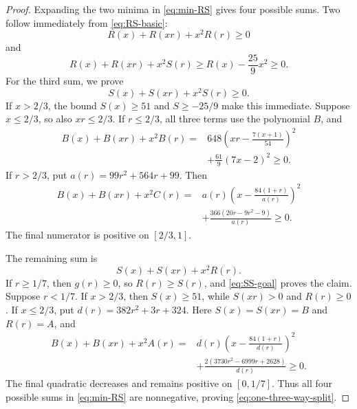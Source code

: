 \documentclass[10pt,a4paper]{amsart}
\begin{document}
\begin{proof}
Expanding the two minima in \eqref{eq:min-RS} gives four possible sums.
Two follow immediately from \eqref{eq:RS-basic}:
\[
 R(x)+R(xr)+x^2R(r)\ge0
\]
and
\[
 R(x)+R(xr)+x^2S(r)
 \ge R(x)-\frac{25}{9}x^2\ge0.
\]
For the third sum, we prove
\begin{equation}\label{eq:SS-goal}
 S(x)+S(xr)+x^2S(r)\ge0.
\end{equation}
If $x>2/3$, the bound $S(x)\ge51$ and
$S\ge-25/9$ make this immediate.  Suppose $x\le2/3$, so also
$xr\le2/3$.  If $r\le2/3$, all three terms use the polynomial $B$, and
\begin{equation}\label{eq:critical-sos}
 \begin{aligned}
 B(x)+B(xr)+x^2B(r)
 ={}&648\left(xr-\frac{7(x+1)}{54}\right)^2\\
 &+\frac{61}{9}(7x-2)^2\ge0.
 \end{aligned}
\end{equation}
If $r>2/3$, put $a(r)=99r^2+564r+99$.  Then
\begin{equation}\label{eq:SS-large-r}
 \begin{aligned}
 B(x)+B(xr)+x^2C(r)
 ={}&a(r)\left(x-\frac{84(1+r)}{a(r)}\right)^2\\
 &+\frac{366(20r-9r^2-9)}{a(r)}\ge0.
 \end{aligned}
\end{equation}
The final numerator is positive on $[2/3,1]$.

The remaining sum is
\begin{equation}\label{eq:SR-goal}
 S(x)+S(xr)+x^2R(r).
\end{equation}
If $r\ge1/7$, then $g(r)\ge0$, so $R(r)\ge S(r)$, and
\eqref{eq:SS-goal} proves the claim.  Suppose $r<1/7$.  If $x>2/3$,
then $S(x)\ge51$, while $S(xr)>0$ and $R(r)\ge0$.  If $x\le2/3$, put
$d(r)=382r^2+3r+324$.  Here $S(x)=S(xr)=B$ and $R(r)=A$, and
\begin{equation}\label{eq:SR-small-r}
 \begin{aligned}
 B(x)+B(xr)+x^2A(r)
 ={}&d(r)\left(x-\frac{84(1+r)}{d(r)}\right)^2\\
 &+\frac{2(3730r^2-6999r+2628)}{d(r)}\ge0.
 \end{aligned}
\end{equation}
The final quadratic decreases and remains positive on $[0,1/7]$.
Thus all four possible sums in \eqref{eq:min-RS} are nonnegative, proving
\eqref{eq:one-three-way-split}.
\end{proof}
\end{document}
